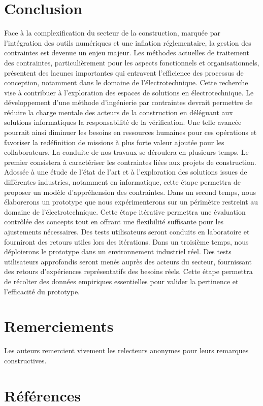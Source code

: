 \documentclass[a4paper,12pt]{article}
\begin{document}
\section{Conclusion}
\label{sec:orga3faaae}
Face à la complexification du secteur de la construction, marquée par l'intégration des outils numériques et une inflation réglementaire, la gestion des contraintes est devenue un enjeu majeur. Les méthodes actuelles de traitement des contraintes, particulièrement pour les aspects fonctionnels et organisationnels, présentent des lacunes importantes qui entravent l'efficience des processus de conception, notamment dans le domaine de l'électrotechnique.
Cette recherche vise à contribuer à l’exploration des espaces de solutions en électrotechnique. Le développement d’une méthode d’ingénierie par contraintes devrait permettre de réduire la charge mentale des acteurs de la construction en déléguant aux solutions informatiques la responsabilité de la vérification. Une telle avancée pourrait ainsi diminuer les besoins en ressources humaines pour ces opérations et favoriser la redéfinition de missions à plus forte valeur ajoutée pour les collaborateurs.
La conduite de nos travaux se déroulera en plusieurs temps. Le premier consistera à caractériser les contraintes liées aux projets de construction. Adossée à une étude de l’état de l’art et à l’exploration des solutions issues de différentes industries, notamment en informatique, cette étape permettra de proposer un modèle d'appréhension des contraintes. Dans un second temps, nous élaborerons un prototype que nous expérimenterons sur un périmètre restreint au domaine de l’électrotechnique. Cette étape itérative permettra une évaluation contrôlée des concepts tout en offrant une flexibilité suffisante pour les ajustements nécessaires. Des tests utilisateurs seront conduits en laboratoire et fourniront des retours utiles lors des itérations. Dans un troisième temps, nous déploierons le prototype dans un environnement industriel réel. Des tests utilisateurs approfondis seront menés auprès des acteurs du secteur, fournissant des retours d'expériences représentatifs des besoins réels. Cette étape permettra de récolter des données empiriques essentielles pour valider la pertinence et l’efficacité du prototype.
\section{Remerciements}
\label{sec:orgfd8700e}
Les auteurs remercient vivement les relecteurs anonymes pour leurs remarques constructives.
\section{Références}
\label{sec:org0f73473}
\begin{multicols}{2}
\small{
\printbibliography[heading=none]
}\clearpage\end{multicols}
\end{document}
